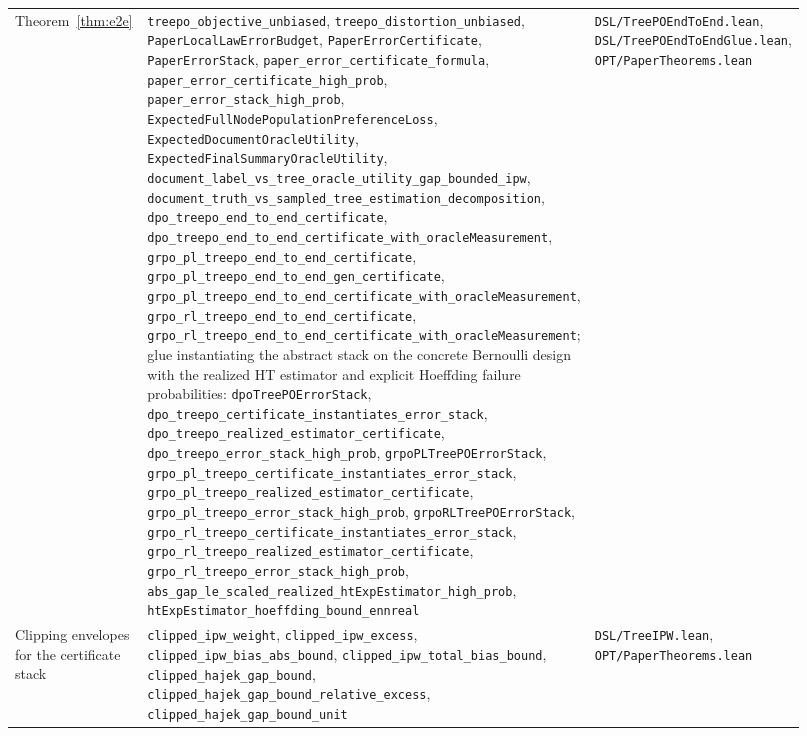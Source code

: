 {\begin{longtable}{p{0.28\linewidth}p{0.34\linewidth}p{0.30\linewidth}}
Theorem~\ref{thm:e2e} &
\texttt{treepo\_objective\_unbiased}, \texttt{treepo\_distortion\_unbiased}, \texttt{PaperLocalLawErrorBudget}, \texttt{PaperErrorCertificate}, \texttt{PaperErrorStack}, \texttt{paper\_error\_certificate\_formula}, \texttt{paper\_error\_certificate\_high\_prob}, \texttt{paper\_error\_stack\_high\_prob}, \texttt{ExpectedFullNodePopulationPreferenceLoss}, \texttt{ExpectedDocumentOracleUtility}, \texttt{ExpectedFinalSummaryOracleUtility}, \texttt{document\_label\_vs\_tree\_oracle\_utility\_gap\_bounded\_ipw}, \texttt{document\_truth\_vs\_sampled\_tree\_estimation\_decomposition}, \texttt{dpo\_treepo\_end\_to\_end\_certificate}, \texttt{dpo\_treepo\_end\_to\_end\_certificate\_with\_oracleMeasurement}, \texttt{grpo\_pl\_treepo\_end\_to\_end\_certificate}, \texttt{grpo\_pl\_treepo\_end\_to\_end\_gen\_certificate}, \texttt{grpo\_pl\_treepo\_end\_to\_end\_certificate\_with\_oracleMeasurement}, \texttt{grpo\_rl\_treepo\_end\_to\_end\_certificate}, \texttt{grpo\_rl\_treepo\_end\_to\_end\_certificate\_with\_oracleMeasurement}; glue instantiating the abstract stack on the concrete Bernoulli design with the realized HT estimator and explicit Hoeffding failure probabilities: \texttt{dpoTreePOErrorStack}, \texttt{dpo\_treepo\_certificate\_instantiates\_error\_stack}, \texttt{dpo\_treepo\_realized\_estimator\_certificate}, \texttt{dpo\_treepo\_error\_stack\_high\_prob}, \texttt{grpoPLTreePOErrorStack}, \texttt{grpo\_pl\_treepo\_certificate\_instantiates\_error\_stack}, \texttt{grpo\_pl\_treepo\_realized\_estimator\_certificate}, \texttt{grpo\_pl\_treepo\_error\_stack\_high\_prob}, \texttt{grpoRLTreePOErrorStack}, \texttt{grpo\_rl\_treepo\_certificate\_instantiates\_error\_stack}, \texttt{grpo\_rl\_treepo\_realized\_estimator\_certificate}, \texttt{grpo\_rl\_treepo\_error\_stack\_high\_prob}, \texttt{abs\_gap\_le\_scaled\_realized\_htExpEstimator\_high\_prob}, \texttt{htExpEstimator\_hoeffding\_bound\_ennreal} &
\texttt{DSL/TreePOEndToEnd.lean}, \texttt{DSL/TreePOEndToEndGlue.lean}, \texttt{OPT/PaperTheorems.lean} \\

Clipping envelopes for the certificate stack &
\texttt{clipped\_ipw\_weight}, \texttt{clipped\_ipw\_excess}, \texttt{clipped\_ipw\_bias\_abs\_bound}, \texttt{clipped\_ipw\_total\_bias\_bound}, \texttt{clipped\_hajek\_gap\_bound}, \texttt{clipped\_hajek\_gap\_bound\_relative\_excess}, \texttt{clipped\_hajek\_gap\_bound\_unit} &
\texttt{DSL/TreeIPW.lean}, \texttt{OPT/PaperTheorems.lean} \\


\end{longtable}}
